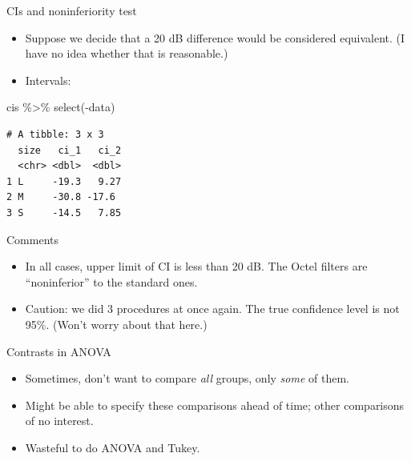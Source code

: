 \documentclass[
  ignorenonframetext,
]{beamer}
\newenvironment{Shaded}{\begin{snugshade}}{\end{snugshade}}
\newcommand{\FunctionTok}[1]{\textcolor[rgb]{0.28,0.35,0.67}{#1}}
\newcommand{\NormalTok}[1]{\textcolor[rgb]{0.00,0.23,0.31}{#1}}
\newcommand{\SpecialCharTok}[1]{\textcolor[rgb]{0.37,0.37,0.37}{#1}}
\begin{document}
\begin{frame}[fragile]{CIs and noninferiority test}
\protect\hypertarget{cis-and-noninferiority-test}{}
\begin{itemize}
\item
  Suppose we decide that a 20 dB difference would be considered
  equivalent. (I have no idea whether that is reasonable.)
\item
  Intervals: \vspace{2ex}
\end{itemize}

\small

\begin{Shaded}
\begin{Highlighting}[]
\NormalTok{cis }\SpecialCharTok{\%\textgreater{}\%} \FunctionTok{select}\NormalTok{(}\SpecialCharTok{{-}}\NormalTok{data)}
\end{Highlighting}
\end{Shaded}

\begin{verbatim}
# A tibble: 3 x 3
  size   ci_1   ci_2
  <chr> <dbl>  <dbl>
1 L     -19.3   9.27
2 M     -30.8 -17.6 
3 S     -14.5   7.85
\end{verbatim}

\normalsize
\end{frame}

\begin{frame}{Comments}
\protect\hypertarget{comments-3}{}
\begin{itemize}
\item
  In all cases, upper limit of CI is less than 20 dB. The Octel filters
  are ``noninferior'' to the standard ones.
\item
  Caution: we did 3 procedures at once again. The true confidence level
  is not 95\%. (Won't worry about that here.)
\end{itemize}
\end{frame}

\begin{frame}{Contrasts in ANOVA}
\protect\hypertarget{contrasts-in-anova}{}
\begin{itemize}
\item
  Sometimes, don't want to compare \emph{all} groups, only \emph{some}
  of them.
\item
  Might be able to specify these comparisons ahead of time; other
  comparisons of no interest.
\item
  Wasteful to do ANOVA and Tukey.
\end{itemize}
\end{frame}
\end{document}
